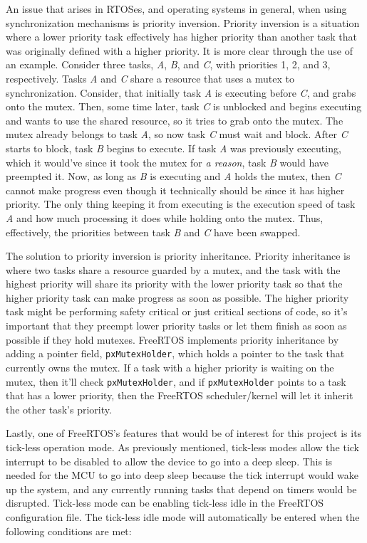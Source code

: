 An issue that arises in RTOSes, and operating systems in general, when using
synchronization mechanisms is priority inversion. Priority inversion is a
situation where a lower priority task effectively has higher priority than
another task that was originally defined with a higher priority. It is more
clear through the use of an example. Consider three tasks, \emph{A}, \emph{B},
and \emph{C}, with priorities 1, 2, and 3, respectively. Tasks \emph{A} and
\emph{C} share a resource that uses a mutex to synchronization. Consider, that
initially task \emph{A} is executing before \emph{C}, and grabs onto the mutex.
Then, some time later, task \emph{C} is unblocked and begins executing and wants
to use the shared resource, so it tries to grab onto the mutex. The mutex
already belongs to task \emph{A}, so now task \emph{C} must wait and block.
After \emph{C} starts to block, task \emph{B} begins to execute. If task
\emph{A} was previously executing, which it would've since it took the mutex for
\emph{a reason}, task \emph{B} would have preempted it. Now, as long as \emph{B}
is executing and \emph{A} holds the mutex, then \emph{C} cannot make progress
even though it technically should be since it has higher priority. The only
thing keeping it from executing is the execution speed of task \emph{A} and how
much processing it does while holding onto the mutex. Thus, effectively, the
priorities between task \emph{B} and \emph{C} have been swapped.

The solution to priority inversion is priority inheritance. Priority inheritance
is where two tasks share a resource guarded by a mutex, and the task with the
highest priority will share its priority with the lower priority task so that
the higher priority task can make progress as soon as possible. The higher
priority task might be performing safety critical or just critical sections of
code, so it's important that they preempt lower priority tasks or let them
finish as soon as possible if they hold mutexes. FreeRTOS implements priority
inheritance by adding a pointer field, \texttt{pxMutexHolder}, which holds a pointer to
the task that currently owns the mutex. If a task with a higher priority is
waiting on the mutex, then it'll check \texttt{\texttt{pxMutexHolder}}, and if \texttt{pxMutexHolder}
points to a task that has a lower priority, then the FreeRTOS scheduler/kernel
will let it inherit the other task's priority.

Lastly, one of FreeRTOS's features that would be of interest for this project is
its tick-less operation mode. As previously mentioned, tick-less modes allow the
tick interrupt to be disabled to allow the device to go into a deep sleep. This
is needed for the MCU to go into deep sleep because the tick interrupt would
wake up the system, and any currently running tasks that depend on timers would
be disrupted. Tick-less mode can be enabling tick-less idle in the FreeRTOS
configuration file. The tick-less idle mode will automatically be entered when
the following conditions are met:

